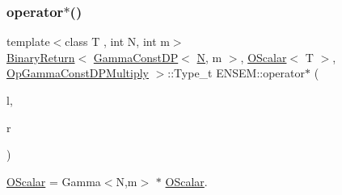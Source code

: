 \subsubsection{\texorpdfstring{operator$\ast$()}{operator*()}\hspace{0.1cm}{\footnotesize\ttfamily [4/5]}}
{\footnotesize\ttfamily template$<$class T , int N, int m$>$ \\
\mbox{\hyperlink{structENSEM_1_1BinaryReturn}{Binary\+Return}}$<$ \mbox{\hyperlink{classENSEM_1_1GammaConstDP}{Gamma\+Const\+DP}}$<$ \mbox{\hyperlink{adat__devel_2lib_2hadron_2operator__name__util_8cc_a7722c8ecbb62d99aee7ce68b1752f337}{N}}, m $>$, \mbox{\hyperlink{classENSEM_1_1OScalar}{O\+Scalar}}$<$ T $>$, \mbox{\hyperlink{structENSEM_1_1OpGammaConstDPMultiply}{Op\+Gamma\+Const\+D\+P\+Multiply}} $>$\+::Type\+\_\+t E\+N\+S\+E\+M\+::operator$\ast$ (\begin{DoxyParamCaption}\item[{const \mbox{\hyperlink{classENSEM_1_1GammaConstDP}{Gamma\+Const\+DP}}$<$ \mbox{\hyperlink{adat__devel_2lib_2hadron_2operator__name__util_8cc_a7722c8ecbb62d99aee7ce68b1752f337}{N}}, m $>$ \&}]{l,  }\item[{const \mbox{\hyperlink{classENSEM_1_1OScalar}{O\+Scalar}}$<$ T $>$ \&}]{r }\end{DoxyParamCaption})\hspace{0.3cm}{\ttfamily [inline]}}



\mbox{\hyperlink{classENSEM_1_1OScalar}{O\+Scalar}} = Gamma$<$\+N,m$>$ $\ast$ \mbox{\hyperlink{classENSEM_1_1OScalar}{O\+Scalar}}. 

\mbox{\label{group__obsscalar_ga3a908302b6f4903874da2282ce03fdf7}} 
